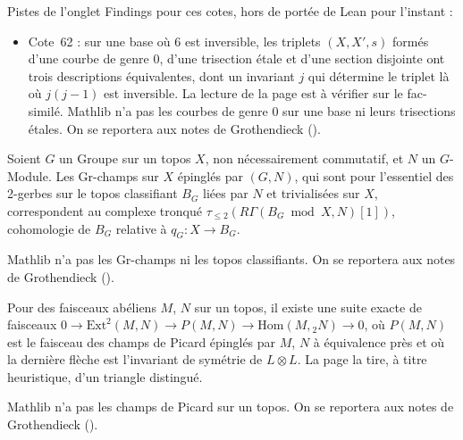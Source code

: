 \noindent Pistes de l'onglet Findings pour ces cotes, hors de portée de Lean pour l'instant :
\begin{itemize}\small\setlength{\itemsep}{0pt}
\item Cote~62 : sur une base où $6$ est inversible, les triplets $(X, X', s)$ formés d'une courbe de genre $0$, d'une trisection étale et d'une section disjointe ont trois descriptions équivalentes, dont un invariant $j$ qui détermine le triplet là où $j(j-1)$ est inversible. La lecture de la page est à vérifier sur le fac-similé. Mathlib n'a pas les courbes de genre $0$ sur une base ni leurs trisections étales. On se reportera aux notes de Grothendieck ().
\end{itemize}

\begin{encadre}
\begin{theoreme*}\nonverifie
Soient $G$ un Groupe sur un topos $X$, non nécessairement commutatif, et $N$ un $G$-Module. Les Gr-champs sur $X$ épinglés par $(G, N)$, qui sont pour l'essentiel des 2-gerbes sur le topos classifiant $B_G$ liées par $N$ et trivialisées sur $X$, correspondent au complexe tronqué $\tau_{\leq 2}(R\Gamma(B_G \bmod X, N)[1])$, cohomologie de $B_G$ relative à $q_G : X \to B_G$.
\end{theoreme*}
\end{encadre}
{\small Mathlib n'a pas les Gr-champs ni les topos classifiants. On se reportera aux notes de Grothendieck ().\par}

\begin{encadre}
\begin{theoreme*}\nonverifie
Pour des faisceaux abéliens $M$, $N$ sur un topos, il existe une suite exacte de faisceaux $0 \to \mathrm{Ext}^2(M, N) \to P(M, N) \to \mathrm{Hom}(M, {}_2N) \to 0$, où $P(M, N)$ est le faisceau des champs de Picard épinglés par $M$, $N$ à équivalence près et où la dernière flèche est l'invariant de symétrie de $L \otimes L$. La page la tire, à titre heuristique, d'un triangle distingué.
\end{theoreme*}
\end{encadre}
{\small Mathlib n'a pas les champs de Picard sur un topos. On se reportera aux notes de Grothendieck ().\par}

